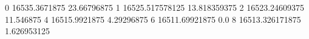 0 16535.3671875 23.66796875
1 16525.517578125 13.818359375
2 16523.24609375 11.546875
4 16515.9921875 4.29296875
6 16511.69921875 0.0
8 16513.326171875 1.626953125
